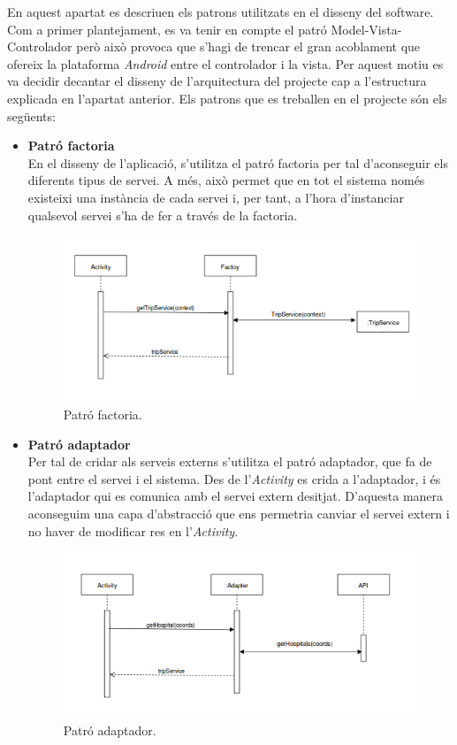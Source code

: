 En aquest apartat es descriuen els patrons utilitzats en el disseny del software. Com a primer plantejament, es va tenir en compte el patró Model-Vista-Controlador però això provoca que s'hagi de trencar el gran acoblament que ofereix la plataforma \textit{Android} entre el controlador i la vista. Per aquest motiu es va decidir decantar el disseny de l'arquitectura del projecte cap a l'estructura explicada en l'apartat anterior. Els patrons que es treballen en el projecte són els següents:
\begin{itemize}
\item{\textbf{Patró factoria}}\\
En el disseny de l'aplicació, s'utilitza el patró factoria per tal d'aconseguir els diferents tipus de servei. A més, això permet que en tot el sistema només existeixi una instància de cada servei i, per tant, a l'hora d'instanciar qualsevol servei s'ha de fer a través de la factoria.

\begin{figure}[!h]
\centering
\includegraphics[scale=0.75]{Figures/patroFactoria.png}
\caption{Patró factoria.}
\end{figure}

\item{\textbf{Patró adaptador}}\\
Per tal de cridar als serveis externs s'utilitza el patró adaptador, que fa de pont entre el servei i el sistema. Des de l'\textit{Activity} es crida a l'adaptador, i és l'adaptador qui es comunica amb el servei extern desitjat. D'aquesta manera aconseguim una capa d'abstracció que ens permetria canviar el servei extern i no haver de modificar res en l'\textit{Activity}.

\begin{figure}[!h]
\centering
\includegraphics[scale=0.75]{Figures/patroAdaptador.png}
\caption{Patró adaptador.}
\end{figure}


\end{itemize}
